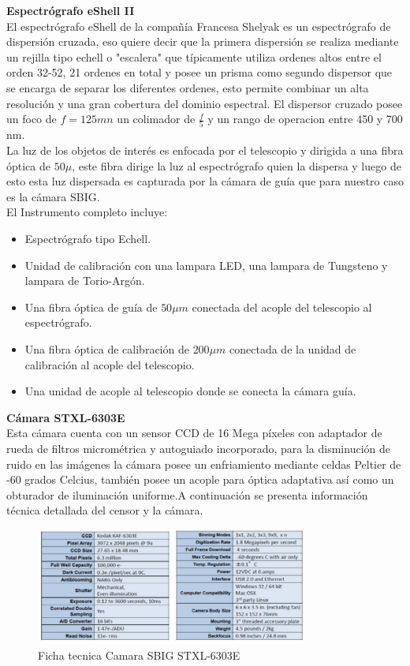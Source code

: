 \noindent \textbf{Espectrógrafo  eShell II }\\

El espectrógrafo eShell de la compañía Francesa Shelyak es un espectrógrafo de dispersión cruzada, eso quiere decir que la primera dispersión se realiza mediante un rejilla tipo echell  o "escalera" que típicamente utiliza ordenes altos entre el orden 32-52, 21 ordenes en total y posee un prisma como segundo dispersor que se encarga de separar los diferentes ordenes, esto permite combinar un alta resolución y una gran cobertura del dominio espectral.
El dispersor cruzado posee un foco de $f=125 mn$ un colimador de $\frac{f}{5}$ y un rango de operacion entre 450 y 700 nm.\\
La luz de los objetos de interés es enfocada por el telescopio y dirigida a una fibra óptica de $50\mu$, este fibra dirige la luz al espectrógrafo quien la dispersa y luego de esto esta luz dispersada es capturada por la cámara de guía que para nuestro caso es la cámara SBIG.\cite{echell}\\

\noindent El Instrumento completo incluye:

\begin{itemize}
    \item Espectrógrafo tipo Echell.
    \item Unidad de calibración con una lampara LED, una lampara de  Tungsteno y lampara de Torio-Argón.
    \item Una fibra óptica de guía de $50 \mu m$ conectada del acople del telescopio al espectrógrafo.
    \item Una fibra óptica de calibración de $200 \mu m$ conectada de la unidad de calibración al acople del telescopio.
    \item Una unidad de acople al telescopio donde se conecta la cámara guía.
\end{itemize}{}



\noindent \textbf{Cámara STXL-6303E }\\

Esta cámara cuenta con un sensor CCD de 16 Mega píxeles con adaptador de rueda de filtros micrométrica y autoguiado incorporado, para la disminución de ruido en las imágenes la cámara posee un enfriamiento mediante celdas Peltier de -60 grados Celcius, también posee un acople para óptica adaptativa así como un obturador de iluminación uniforme.A continuación se presenta información técnica detallada del censor y la cámara.

\begin{figure}[htb!]
\centering
\includegraphics[width=0.8\textwidth]{images/7.png}
\caption[Espectro continuo.]{Ficha tecnica Camara SBIG STXL-6303E\cite{gra7}}
 \label{fig2}
\end{figure}


